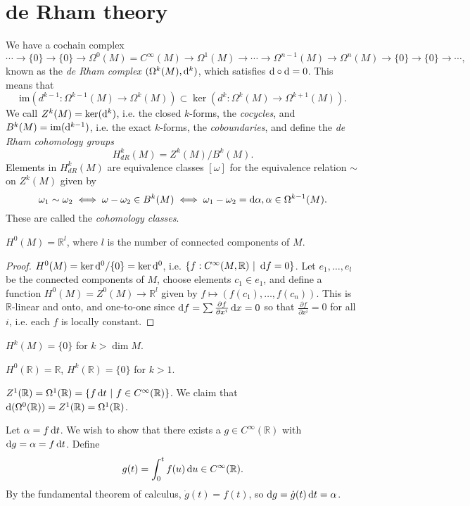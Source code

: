 \section{de Rham theory}
We have a cochain complex
$$
\cdots \to \{ 0 \} \to \{ 0 \} \to
\Omega^0(M) = C^\infty(M) \to
\Omega^1(M) \to \cdots \to
\Omega^{n-1}(M) \to
\Omega^n(M) \to
\{0\} \to \{0\} \to \cdots,
$$
known as the \emph{de Rham complex}
$(\Omega^k(M), \mathop{}\!\mathrm{d}^k)$, which satisfies $\mathop{}\!\mathrm{d} \circ \mathop{}\!\mathrm{d} = 0$.
This means that
$$
        \mathrm{im}(d^{k-1}: \Omega^{k-1}(M) \to \Omega^k(M))
\subset \ker(d^k : \Omega^k(M) \to \Omega^{k+1}(M)).
$$
We call $Z^k(M) = \ker(\mathop{}\!\mathrm{d}^k)$, i.e. the closed $k$-forms,
the \emph{cocycles}, and $B^k(M) = \mathrm{im}(\mathop{}\!\mathrm{d}^{k-1})$, i.e. the
exact $k$-forms, the \emph{coboundaries}, and define the
\emph{de Rham cohomology groups}
$$
  H^k_{dR}(M)
= Z^k(M) / B^k(M).
$$
Elements in $H^k_{dR}(M)$ are equivalence classes $[\omega]$ for the
equivalence relation $\sim$ on $Z^k(M)$ given by
$$
     \omega_1 \sim \omega_2
\iff \omega - \omega_2 \in B^k(M)
\iff \omega_1 - \omega_2 = \mathop{}\!\mathrm{d} \alpha, \alpha \in \Omega^{k-1}(M).
$$
These are called the \emph{cohomology classes}.

\begin{prop}
$H^0(M) = \mathbb{R}^l$, where $l$ is the number of connected
components of $M$.
\end{prop}

\begin{proof}
$H^0(M) = \ker \mathop{}\!\mathrm{d}^0 / \{ 0 \} = \ker \mathop{}\!\mathrm{d}^0$, i.e.
$\{ f : C^\infty(M, \mathbb{R}) ~\vert~ \mathop{}\!\mathrm{d} f = 0 \}$.
Let $e_1, \dots, e_l$ be the connected components of $M$,
choose elements $c_1 \in e_1$, and define a function
$H^0(M) = Z^0(M) \to \mathbb{R}^l$ given by
$f \mapsto (f(c_1), \dots, f(c_n))$. This is $\mathbb{R}$-linear and
onto, and one-to-one since
$\mathop{}\!\mathrm{d} f = \sum \frac{\partial f}{\partial x^i} \mathop{}\!\mathrm{d} x = 0$ so that
$\frac{\partial f}{\partial x^i} = 0$ for all $i$, i.e. each
$f$ is locally constant.
\end{proof}

\begin{remark}
$H^k(M) = \{ 0 \}$ for $k > \dim M$.
\end{remark}

\begin{xmpl}
$H^0(\mathbb{R}) = \mathbb{R}$, $H^k(\mathbb{R}) = \{ 0 \}$ for $k >
1$.

$Z^1(\mathbb{R}) = \Omega^1(\mathbb{R}) = \{ f \mathop{}\!\mathrm{d} t ~\vert~ f \in
C^\infty(\mathbb{R})\}$.
We claim that $\mathop{}\!\mathrm{d}(\Omega^0(\mathbb{R})) = Z^1(\mathbb{R}) =
\Omega^1(\mathbb{R})$.

Let $\alpha = f \mathop{}\!\mathrm{d} t$. We wish to show that there exists a
$g \in C^\infty(\mathbb{R})$ with $\mathop{}\!\mathrm{d} g = \alpha = f \mathop{}\!\mathrm{d} t$.
Define
$$
  g(t)
= \int_0^t
    f(u) \mathop{}\!\mathrm{d} u
\in C^\infty(\mathbb{R}).
$$
By the fundamental theorem of calculus, $\dot{g}(t) = f(t)$, so
$\mathop{}\!\mathrm{d} g = \dot{g}(t) \mathop{}\!\mathrm{d} t = \alpha$.
\end{xmpl}

